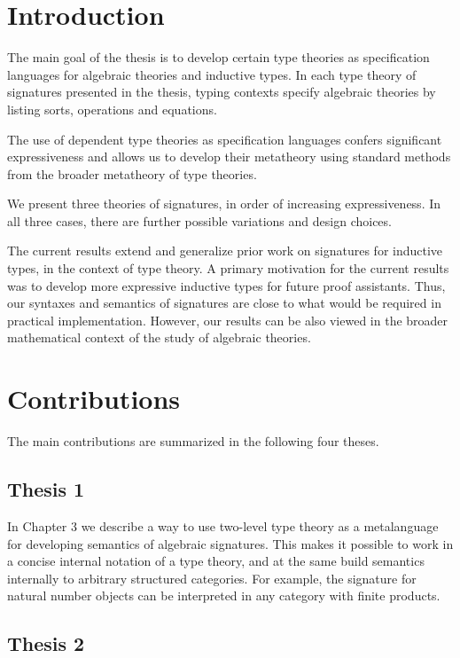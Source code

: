 \documentclass[12pt]{article}
\begin{document}
\section{Introduction}

The main goal of the thesis is to develop certain type theories as specification
languages for algebraic theories and inductive types. In each type theory of
signatures presented in the thesis, typing contexts specify algebraic theories
by listing sorts, operations and equations.

The use of dependent type theories as specification languages confers
significant expressiveness and allows us to develop their metatheory using
standard methods from the broader metatheory of type theories.

We present three theories of signatures, in order of increasing expressiveness.
In all three cases, there are further possible variations and design choices.

The current results extend and generalize prior work on signatures for inductive
types, in the context of type theory. A primary motivation for the current
results was to develop more expressive inductive types for future proof
assistants. Thus, our syntaxes and semantics of signatures are close to what
would be required in practical implementation. However, our results can be also
viewed in the broader mathematical context of the study of algebraic theories.

\section{Contributions}

The main contributions are summarized in the following four theses.

\subsection*{Thesis 1}

In Chapter 3 we describe a way to use two-level type theory \cite{twolevel} as a
metalanguage for developing semantics of algebraic signatures. This makes it
possible to work in a concise internal notation of a type theory, and at the
same build semantics internally to arbitrary structured categories. For example,
the signature for natural number objects can be interpreted in any category with
finite products.

\subsection*{Thesis 2}
\end{document}
